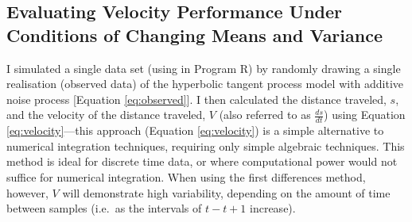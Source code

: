 \documentclass[print]{nuthesis}
\begin{document}
\hypertarget{evaluating-velocity-performance-under-conditions-of-changing-means-and-variance}{%
\subsection{Evaluating Velocity Performance Under Conditions of Changing Means and Variance}\label{evaluating-velocity-performance-under-conditions-of-changing-means-and-variance}}

I simulated a single data set (using in Program R) by randomly drawing a single realisation (observed data) of the hyperbolic tangent process model with additive noise process {[}Equation \eqref{eq:observed}{]}. I then calculated the distance traveled, \(s\), and the velocity of the distance traveled, \(V\) (also referred to as \(\frac{ds}{dt}\)) using Equation \eqref{eq:velocity}---this approach (Equation \eqref{eq:velocity}) is a simple alternative to numerical integration techniques, requiring only simple algebraic techniques. This method is ideal for discrete time data, or where computational power would not suffice for numerical integration. When using the first differences method, however, \(V\) will demonstrate high variability, depending on the amount of time between samples (i.e.~as the intervals of \(t-t+1\) increase).
\end{document}
